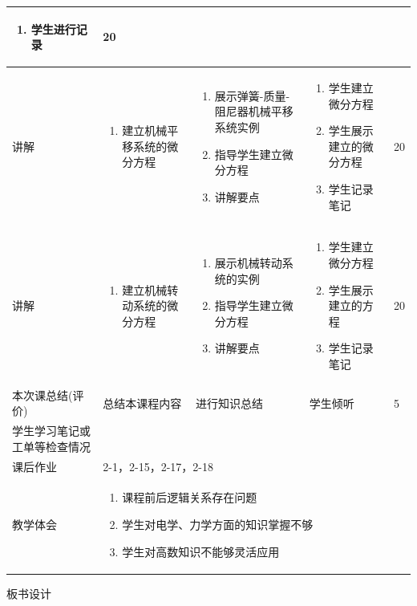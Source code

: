 {\begin{landscape}
\begin{longtable}{|m{10mm}|m{50mm}|m{50mm}|m{50mm}|m{15mm}|}
\begin{enumerate}
\item 学生进行记录
\end{enumerate} &20 \\\hline
讲解&\begin{enumerate}
\item 建立机械平移系统的微分方程
\end{enumerate}
 &\begin{enumerate}
\item 展示弹簧-质量-阻尼器机械平移系统实例
\item 指导学生建立微分方程
\item 讲解要点
\end{enumerate} &\begin{enumerate}
\item 学生建立微分方程
\item 学生展示建立的微分方程
\item 学生记录笔记
\end{enumerate} &20 \\\hline
讲解&
\begin{enumerate}
\item 建立机械转动系统的微分方程
\end{enumerate}
 &\begin{enumerate}
\item 展示机械转动系统的实例
\item 指导学生建立微分方程
\item 讲解要点
\end{enumerate} &\begin{enumerate}
\item 学生建立微分方程
\item 学生展示建立的方程
\item 学生记录笔记
\end{enumerate} &20 \\\hline
\centering 本次课总结(评价)&总结本课程内容 &进行知识总结 &学生倾听 &5 \\\hline
\centering 学生学习笔记或工单等检查情况&\multicolumn{4}{m{165mm}|}{\quad}\\\hline
\centering 课后作业&\multicolumn{4}{m{165mm}|}{2-1，2-15，2-17，2-18}\\\hline
\centering 教学体会&\multicolumn{4}{m{165mm}|}{\begin{enumerate}
\item 课程前后逻辑关系存在问题
\item 学生对电学、力学方面的知识掌握不够
\item 学生对高数知识不能够灵活应用
\end{enumerate}}
\end{longtable}

\end{landscape}
\clearpage
\begin{center}
{\huge 板书设计}
\end{center}
}
